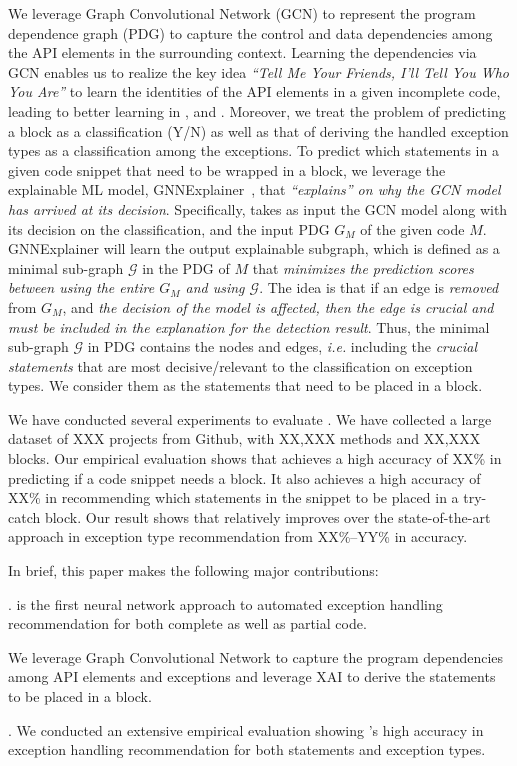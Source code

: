 We leverage Graph Convolutional Network (GCN) to represent the program
dependence graph (PDG) to capture the control and data dependencies
among the API elements in the surrounding context. Learning the
dependencies via GCN enables us to realize the key idea {\em ``Tell Me
  Your Friends, I'll Tell You Who You Are''} to learn the identities
of the API elements in a given incomplete code, leading to better
learning in {\xblock}, {\xstate} and {\xtype}. Moreover, we treat the
problem of predicting a  block as a classification
(Y/N) as well as that of deriving the handled exception types as a
classification among the exceptions.
%
To predict which statements in a given code snippet that need to be
wrapped in a  block, we leverage the explainable ML
model, GNNExplainer~\cite{GNNExplainer}, that {\em ``explains'' on why
  the GCN model has arrived at its decision}. Specifically, {\tool}
takes as input the GCN model along with its decision on the
classification, and the input PDG $G_M$ of the given code
$M$. GNNExplainer will learn the output explainable subgraph, which is
defined as a minimal sub-graph $\mathcal{G}$ in the PDG of $M$ that
{\em minimizes the prediction scores between using the entire $G_M$
  and using $\mathcal{G}$}. The idea is that if an edge is {\em
  removed} from $G_M$, and {\em the decision of the model is affected,
  then the edge is crucial and must be included in the explanation for
  the detection result}. Thus, the minimal sub-graph $\mathcal{G}$ in
PDG contains the nodes and edges, {\em i.e.}  including the {\em
  crucial statements} that are most decisive/relevant to the
classification on exception types. We consider them as the statements
that need to be placed in a  block.

We have conducted several experiments to evaluate {\tool}. We have
collected a large dataset of XXX projects from Github, with XX,XXX
methods and XX,XXX  blocks. Our empirical evaluation
shows that {\tool} achieves a high accuracy of XX\% in predicting if a
code snippet needs a  block. It also achieves a high
accuracy of XX\% in recommending which statements in the snippet to be
placed in a try-catch block. Our result shows that {\xtype} relatively
improves over the state-of-the-art approach in exception type
recommendation from XX\%–YY\% in accuracy.

In brief, this paper makes the following major contributions:

. {\tool} is the first neural network approach to
  automated exception handling recommendation for both complete as
  well as partial code.

   We
  leverage Graph Convolutional Network to capture the program
  dependencies among API elements and exceptions and leverage XAI
  to derive the statements to be placed in a  block.

. We conducted an extensive
empirical evaluation showing {\tool}'s high accuracy in exception
handling recommendation for both statements and exception types.

  
